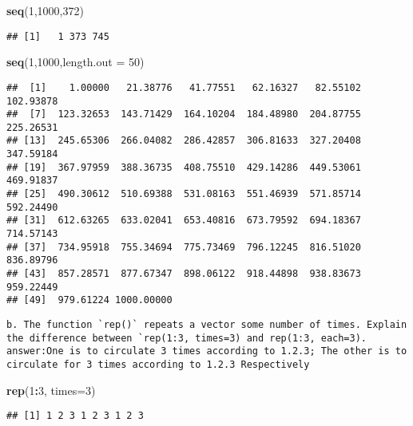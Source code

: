 \documentclass[
]{article}
\newenvironment{Shaded}{\begin{snugshade}}{\end{snugshade}}
\newcommand{\DataTypeTok}[1]{\textcolor[rgb]{0.13,0.29,0.53}{#1}}
\newcommand{\DecValTok}[1]{\textcolor[rgb]{0.00,0.00,0.81}{#1}}
\newcommand{\KeywordTok}[1]{\textcolor[rgb]{0.13,0.29,0.53}{\textbf{#1}}}
\newcommand{\NormalTok}[1]{#1}
\newcommand{\OperatorTok}[1]{\textcolor[rgb]{0.81,0.36,0.00}{\textbf{#1}}}
\begin{document}
\begin{Shaded}
\begin{Highlighting}[]
\KeywordTok{seq}\NormalTok{(}\DecValTok{1}\NormalTok{,}\DecValTok{1000}\NormalTok{,}\DecValTok{372}\NormalTok{)}
\end{Highlighting}
\end{Shaded}

\begin{verbatim}
## [1]   1 373 745
\end{verbatim}

\begin{Shaded}
\begin{Highlighting}[]
\KeywordTok{seq}\NormalTok{(}\DecValTok{1}\NormalTok{,}\DecValTok{1000}\NormalTok{,}\DataTypeTok{length.out =} \DecValTok{50}\NormalTok{)}
\end{Highlighting}
\end{Shaded}

\begin{verbatim}
##  [1]    1.00000   21.38776   41.77551   62.16327   82.55102  102.93878
##  [7]  123.32653  143.71429  164.10204  184.48980  204.87755  225.26531
## [13]  245.65306  266.04082  286.42857  306.81633  327.20408  347.59184
## [19]  367.97959  388.36735  408.75510  429.14286  449.53061  469.91837
## [25]  490.30612  510.69388  531.08163  551.46939  571.85714  592.24490
## [31]  612.63265  633.02041  653.40816  673.79592  694.18367  714.57143
## [37]  734.95918  755.34694  775.73469  796.12245  816.51020  836.89796
## [43]  857.28571  877.67347  898.06122  918.44898  938.83673  959.22449
## [49]  979.61224 1000.00000
\end{verbatim}

\begin{verbatim}
b. The function `rep()` repeats a vector some number of times. Explain the difference between `rep(1:3, times=3) and rep(1:3, each=3).
answer:One is to circulate 3 times according to 1.2.3; The other is to circulate for 3 times according to 1.2.3 Respectively
\end{verbatim}

\begin{Shaded}
\begin{Highlighting}[]
\KeywordTok{rep}\NormalTok{(}\DecValTok{1}\OperatorTok{:}\DecValTok{3}\NormalTok{, }\DataTypeTok{times=}\DecValTok{3}\NormalTok{)}
\end{Highlighting}
\end{Shaded}

\begin{verbatim}
## [1] 1 2 3 1 2 3 1 2 3
\end{verbatim}
\end{document}
